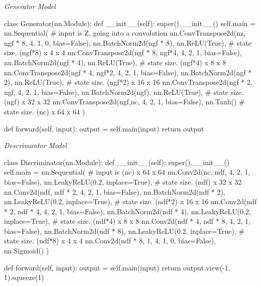 \documentclass{article}
\begin{document}
\begin{minipage}{\textwidth}
\vspace{8pt}
\emph{Generator Model}
\vspace{8pt}
\begin{ipythonnb}
class Generator(nn.Module):
    def __init__(self):
        super().__init__()
        self.main = nn.Sequential(
            # input is Z, going into a convolution
            nn.ConvTranspose2d(nz, ngf * 8, 4, 1, 0, bias=False),
            nn.BatchNorm2d(ngf * 8),
            nn.ReLU(True),
            # state size. (ngf*8) x 4 x 4
            nn.ConvTranspose2d(ngf * 8, ngf*4, 4, 2, 1, bias=False),
            nn.BatchNorm2d(ngf * 4),
            nn.ReLU(True),
            # state size. (ngf*4) x 8 x 8
            nn.ConvTranspose2d(ngf * 4, ngf*2, 4, 2, 1, bias=False),
            nn.BatchNorm2d(ngf * 2),
            nn.ReLU(True),
            # state size. (ngf*2) x 16 x 16
            nn.ConvTranspose2d(ngf * 2, ngf, 4, 2, 1, bias=False),
            nn.BatchNorm2d(ngf),
            nn.ReLU(True),
            # state size. (ngf) x 32 x 32
            nn.ConvTranspose2d(ngf,nc, 4, 2, 1, bias=False),
            nn.Tanh()
            # state size. (nc) x 64 x 64
        )

    def forward(self, input):
        output = self.main(input)
        return output
\end{ipythonnb}
\end{minipage}


\begin{minipage}{\textwidth}
\vspace{8pt}
\emph{Descrimantor Model}
\vspace{8pt}
\begin{ipythonnb}
class Discriminator(nn.Module):
    def __init__(self):
        super().__init__()
        self.main = nn.Sequential(
            # input is (nc) x 64 x 64
            nn.Conv2d(nc, ndf, 4, 2, 1, bias=False),
            nn.LeakyReLU(0.2, inplace=True),
            # state size. (ndf) x 32 x 32
            nn.Conv2d(ndf, ndf * 2, 4, 2, 1, bias=False),
            nn.BatchNorm2d(ndf * 2),
            nn.LeakyReLU(0.2, inplace=True),
            # state size. (ndf*2) x 16 x 16
            nn.Conv2d(ndf * 2, ndf * 4, 4, 2, 1, bias=False),
            nn.BatchNorm2d(ndf * 4),
            nn.LeakyReLU(0.2, inplace=True),
            # state size. (ndf*4) x 8 x 8
            nn.Conv2d(ndf * 4, ndf * 8, 4, 2, 1, bias=False),
            nn.BatchNorm2d(ndf * 8),
            nn.LeakyReLU(0.2, inplace=True),
            # state size. (ndf*8) x 4 x 4
            nn.Conv2d(ndf * 8, 1, 4, 1, 0, bias=False),
            nn.Sigmoid()
        )

    def forward(self, input):
        output = self.main(input)
        return output.view(-1, 1).squeeze(1)
\end{ipythonnb}
\end{minipage}
\end{document}
